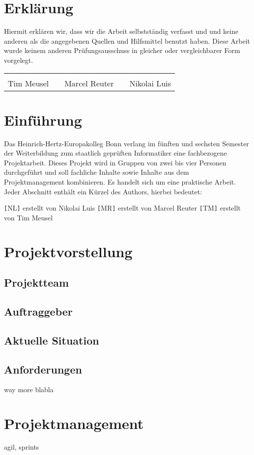 \section{Erklärung}
Hiermit erklären wir, dass wir die Arbeit selbstständig verfasst und und keine
anderen als die angegebenen Quellen und Hilfsmittel benutzt haben. Diese Arbeit
wurde keinem anderen Prüfungsausschuss in gleicher oder vergleichbarer Form
vorgelegt.

\vfill
{\centering
\renewcommand{\arraystretch}{0.9}
\begin{tabular}{p{}p{}p{}p{}p{}}
  \dotfill                    & & \dotfill                      & & \dotfill \\
  \centering\footnotesize{Tim Meusel}& & \centering\footnotesize{Marcel Reuter}& & \centering\footnotesize{Nikolai Luis}%
\end{tabular}
}

\newpage

\section{Einführung}
Das Heinrich-Hertz-Europakolleg Bonn verlang im fünften und sechsten Semester
der Weiterbildung zum staatlich geprüften Informatiker eine fachbezogene
Projektarbeit. Dieses Projekt wird in Gruppen von zwei bis vier Personen
durchgeführt und soll fachliche Inhalte sowie Inhalte aus dem Projektmanagement
kombinieren. Es handelt sich um eine praktische Arbeit. Jeder Abschnitt enthält
ein Kürzel des Authors, hierbei bedeutet:
\begin{outline}
  \1 \verb+[+NL\verb+]+ erstellt von Nikolai Luis
  \1 \verb+[+MR\verb+]+ erstellt von Marcel Reuter
  \1 \verb+[+TM\verb+]+ erstellt von Tim Meusel
\end{outline}

\section{Projektvorstellung}
\subsection{Projektteam}
\subsection{Auftraggeber}
\subsection{Aktuelle Situation}
\subsection{Anforderungen}

\cite{lee2013introduction}
way more blabla

\section{Projektmanagement}
agil, sprints

\printbibliography
